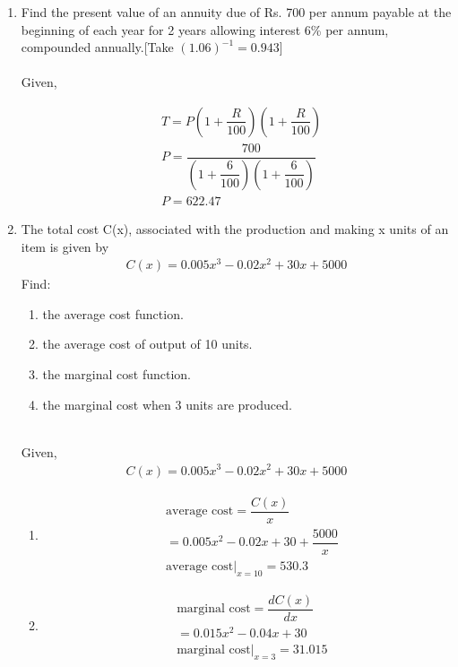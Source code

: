 \documentclass[journal,12pt,twocolumn]{IEEEtran}
\renewcommand\thesection{\arabic{section}}
\begin{document}
\begin{enumerate}[label=\thesection.\arabic*.,ref=\thesection.\theenumi]
\item Find the present value of an annuity due of Rs. 700 per annum payable at the
beginning of each year for 2 years allowing interest 6\% per annum, compounded
annually.[Take $(1.06)^{-1} = 0.943$]\\
\solution\\
Given,
\begin{table}[ht]
 \centering
 \caption{}
 \end{table}
 \begin{align}
 &T= P\left(1+\dfrac{R}{100}\right)\left(1+\dfrac{R}{100}\right)\\
 & P =\dfrac{700}{ \left(1+\dfrac{6}{100}\right)\left(1+\dfrac{6}{100}\right)}\\
 & P = 622.47
 \end{align}

 \item The total cost C(x), associated with the production and making x units of an item is given by
\begin{align}
   C(x) = 0.005x^3 - 0.02x^2 + 30x + 5000 \nonumber
\end{align}
Find:
\begin{enumerate}
\item the average cost function.
\item the average cost of output of 10 units.
\item the marginal cost function.
\item the marginal cost when 3 units are produced.
 \end{enumerate}
 \solution\\ Given,
 \begin{align}
   C(x) = 0.005x^3 - 0.02x^2 + 30x + 5000 
\end{align}
\begin{enumerate}
\item 
\begin{align}
& \text{average cost} = \dfrac{C(x)}{x} \\
&= 0.005x^2 - 0.02x + 30 +\dfrac{5000}{x}\\
&\text{average cost}|_{x=10} = 530.3
\end{align}
\item 
\begin{align}
& \text{marginal cost} = \dfrac{dC(x)}{dx} \\
&= 0.015x^2 - 0.04x + 30\\ 
&\text{marginal cost}|_{x=3} = 31.015
\end{align}
 \end{enumerate}
  \end{enumerate}
\end{document}
